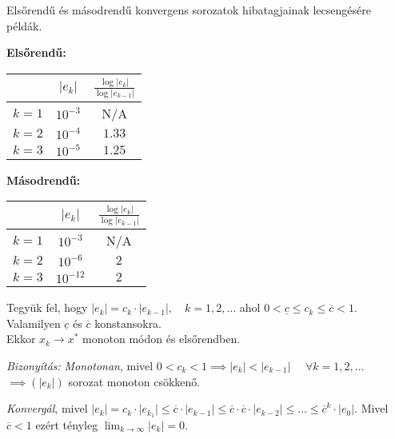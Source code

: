 \begin{pelda} Elsőrendű és másodrendű konvergens sorozatok hibatagjainak lecsengésére példák.
    
\textbf{Elsőrendű:}
\begin{center}
\begin{tabular}{||c c c||} 
 \hline
  & $\lvert e_k \rvert$ & $\frac{\log \lvert e_{k} \rvert}{\log \lvert e_{k-1} \rvert}$ \\ [0.5ex] 
 \hline\hline
 $k = 1$ & $10^{-3}$ & N/A \\ 
 \hline
 $k = 2$ & $10^{-4}$ & $1.33$ \\
 \hline
 $k = 3$ & $10^{-5}$ & $1.25$ \\ [1ex] 
 \hline
\end{tabular}
\end{center}

\textbf{Másodrendű:}
\begin{center}
\begin{tabular}{||c c c||} 
 \hline
  & $\lvert e_k \rvert$ & $\frac{\log \lvert e_{k} \rvert}{\log \lvert e_{k-1} \rvert}$ \\ [0.5ex] 
 \hline\hline
 $k = 1$ & $10^{-3}$ & N/A \\ 
 \hline
 $k = 2$ & $10^{-6}$ & $2$ \\
 \hline
 $k = 3$ & $10^{-12}$ & $2$ \\ [1ex] 
 \hline
\end{tabular}
\end{center}
\end{pelda}


\begin{allitas}
    Tegyük fel, hogy $\lvert e_{k} \rvert = c_{k} \cdot \lvert e_{k-1} \rvert, \quad k = 1, 2, \dots$ ahol $0 < \underline{c} \leq c_{k} \leq \overline{c} < 1$. Valamilyen $\underline{c}$ és $\overline{c}$ konstansokra. \\
    Ekkor $x_{k} \to x^{*}$ monoton módon és elsőrendben.
\end{allitas}

\textit{Bizonyítás:}
\textit{Monotonan}, mivel $0 < c_{k} < 1 \implies \lvert e_{k} \rvert < \lvert e_{k-1} \rvert$ $\quad \forall k = 1, 2, \dots$ $\implies (\lvert e_{k} \rvert)$ sorozat monoton csökkenő.

\textit{Konvergál}, mivel $\lvert e_{k} \rvert = c_{k} \cdot \lvert e_{k_{1}} \rvert \leq \overline c \cdot \lvert e_{k-1} \rvert \leq \overline c \cdot \overline c \cdot \lvert e_{k-2} \rvert \leq \dots \leq \overline c^{k} \cdot \lvert e_{0} \rvert$.  Mivel $\overline c < 1$ ezért tényleg $\lim_{ k \to \infty }\lvert e_{k} \rvert = 0$.

